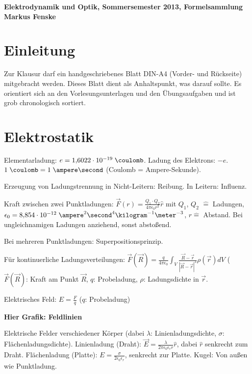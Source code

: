 \documentclass[a4paper,german,12pt,smallheadings]{scrartcl}
\begin{document}
\begin{center}
\bfseries %
\sffamily %
\vspace{-40pt}
Elektrodynamik und Optik, Sommersemester 2013, Formelsammlung \\
Markus Fenske
\vspace{-10pt}
\end{center}

\section*{Einleitung}

Zur Klausur darf ein handgeschriebenes Blatt DIN-A4 (Vorder- und Rückseite)
mitgebracht werden. Dieses Blatt dient als Anhaltspunkt, was darauf sollte. Es
orientiert sich an den Vorlesungsunterlagen und den Übungsaufgaben und ist grob
chronologisch sortiert.

\section{Elektrostatik}
Elementarladung: $e = 1{,}6022 \cdot 10^{-19} \;\coulomb$. Ladung des Elektrons:
$-e$. $1 \;\coulomb = 1 \;\ampere \second$ (Coulomb = Ampere-Sekunde).

Erzeugung von Ladungstrennung in Nicht-Leitern: Reibung. In Leitern: Influenz.

Kraft zwischen zwei Punktladungen: $\vec{F}(r) = \frac{Q_1 \cdot Q_2}{4 \pi
\epsilon_0 r^2} \widehat{r}$ mit $Q_1$, $Q_2$ $\widehat{=}$ Ladungen,
$\epsilon_0 = 8{,}854 \cdot 10^{-12} \;\ampere^2 \second^4 \kilogram^{-1}
\meter^{-3}$, $r \widehat{=}$ Abstand. Bei ungleichnamigen Ladungen anziehend, sonst abstoßend.

Bei mehreren Punktladungen: Superpositionsprinzip.

Für kontinuerliche Ladungsverteilungen: $\vec{F}(\vec{R}) = \frac{q}{4 \pi
\epsilon_0} \int_{V} \frac{\vec{R} - \vec{r}}{|\vec{R} - \vec{r}|^3}
\rho(\vec{r}) dV$ ($\vec{F}(\vec{R})$: Kraft am Punkt $\vec{R}$, $q$: Probeladung, $\rho$: Ladungsdichte in $\vec{r}$.

Elektrisches Feld: $E = \frac{F}{q}$ ($q$: Probeladung)

\textbf{Hier Grafik: Feldlinien}

Elektrische Felder verschiedener Körper (dabei $\lambda$: Linienladungsdichte,
$\sigma$: Flächenladungsdichte). Linienladung (Draht): $\vec{E} =
\frac{\lambda}{2 \pi \epsilon_0 \epsilon_r r} \widehat{r}$, dabei $\widehat{r}$
senkrecht zum Draht. Flächenladung (Platte): $E = \frac{\sigma}{2 \epsilon_0
\epsilon_r}$, senkrecht zur Platte. Kugel: Von außen wie Punktladung.
\end{document}
